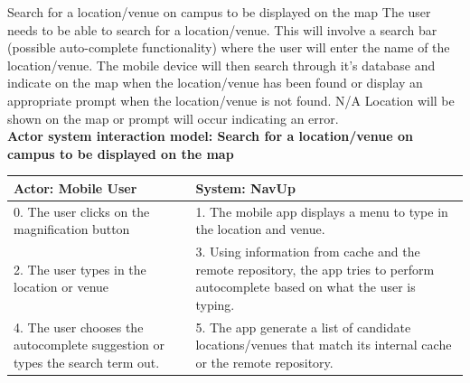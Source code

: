 \FuncReq
{Search for a location/venue on campus to be displayed on the map}
{The user needs to be able to search for a location/venue. This will involve a search bar (possible auto-complete functionality) where the user will enter the name of the location/venue. The mobile device will then search through it's database and indicate on the map when the location/venue has been found or display an appropriate prompt when the location/venue is not found.}
{N/A}
{Location will be shown on the map or prompt will occur indicating an error.}
    \\
    \textbf{Actor system interaction model: Search for a location/venue on campus to be displayed on the map }\\
    \begin{tabular}{ | p{6cm} | p{6cm} |}
    \hline
    Actor: Mobile User & System: NavUp \\ \hline
    0. The user clicks on the magnification button & 1. The mobile app displays a menu to type in the location and venue.\\ \hline
    2. The user types in the location or venue & 3. Using information from cache and the remote repository, the app tries to perform autocomplete based on what the user is typing.\\ \hline
    4. The user chooses the autocomplete suggestion or types the search term out. & 5. The app generate a list of candidate locations/venues that match its internal cache or the remote repository.\\ \hline
    \end{tabular}
\\
\bigskip


